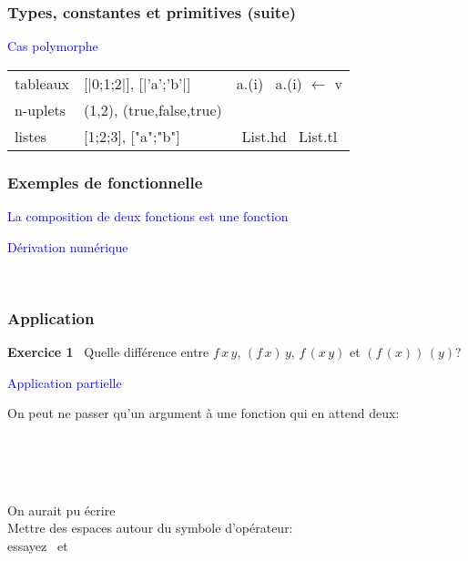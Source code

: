 %
\begin{frame}
\frametitle{Types, constantes et primitives (suite)}

\textcolor{blue}{Cas polymorphe}

\begin{tabular}{|l|l|c|}
\hline
     tableaux
   & \textsf{[|0;1;2|]}, \textsf{[|'a';'b'|]}
   & \textsf{a.(i)} \ \textsf{a.(i) $\leftarrow$ v}\\
    n-uplets
  & \textsf{(1,2)}, \textsf{(true,false,true)}
  & \\ %
    listes
  & \textsf{[1;2;3]}, \textsf{["a";"b"]}
  & \textsf{List.hd} \ \textsf{List.tl}\\
\hline
\end{tabular}

\end{frame}

%
\begin{frame}
\frametitle{Exemples de fonctionnelle}

\textcolor{blue}{La composition de deux fonctions est une fonction}


\textcolor{blue}{Dérivation numérique}

\\

\end{frame}

%
\begin{frame}
\frametitle{Application}

\textbf{Exercice 1} \ Quelle différence entre $f \, x \, y$, $(f \, x) \,
y$, $f \, (x \, y)$ et $(f \, (x)) \, (y)$?

\textcolor{blue}{Application partielle}

On peut ne passer qu'un argument à une fonction qui en attend deux:

\\
\\
\\

\remarque

On aurait pu écrire \\
Mettre des espaces autour du symbole d'opérateur:\\
essayez  \ et \ 

\end{frame}

